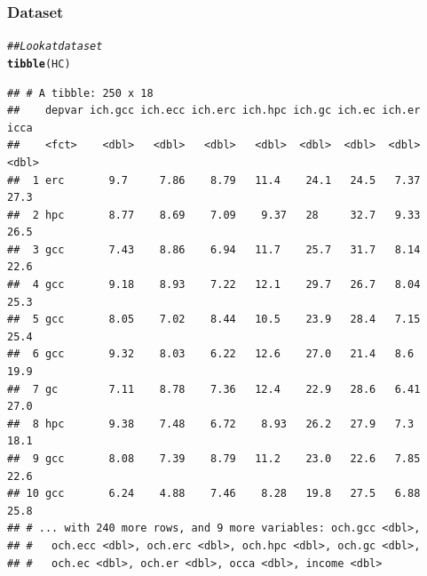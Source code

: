 \documentclass{beamer}\usepackage[]{graphicx}\usepackage[]{xcolor}
\makeatletter
\newcommand{\hlnum}[1]{\textcolor[rgb]{0.686,0.059,0.569}{#1}}%
\newcommand{\hlstr}[1]{\textcolor[rgb]{0.192,0.494,0.8}{#1}}%
\newcommand{\hlcom}[1]{\textcolor[rgb]{0.678,0.584,0.686}{\textit{#1}}}%
\newcommand{\hlopt}[1]{\textcolor[rgb]{0,0,0}{#1}}%
\newcommand{\hlstd}[1]{\textcolor[rgb]{0.345,0.345,0.345}{#1}}%
\newcommand{\hlkwb}[1]{\textcolor[rgb]{0.69,0.353,0.396}{#1}}%
\newcommand{\hlkwc}[1]{\textcolor[rgb]{0.333,0.667,0.333}{#1}}%
\newcommand{\hlkwd}[1]{\textcolor[rgb]{0.737,0.353,0.396}{\textbf{#1}}}%
\newenvironment{kframe}{%
 \def\at@end@of@kframe{}%
 \ifinner\ifhmode%
  \def\at@end@of@kframe{\end{minipage}}%
  \begin{minipage}{\columnwidth}%
 \fi\fi%
 \def\FrameCommand##1{\hskip\@totalleftmargin \hskip-\fboxsep
 \colorbox{shadecolor}{##1}\hskip-\fboxsep
     \hskip-\linewidth \hskip-\@totalleftmargin \hskip\columnwidth}%
 \MakeFramed {\advance\hsize-\width
   \@totalleftmargin\z@ \linewidth\hsize
   \@setminipage}}%
 {\par\unskip\endMakeFramed%
 \at@end@of@kframe}
\newenvironment{knitrout}{}{} %
\makeatother
\begin{document}
\begin{frame}[fragile]\frametitle{Dataset}
\begin{knitrout}\footnotesize
{}\color{fgcolor}\begin{kframe}
\begin{alltt}
\hlcom{## Look at dataset}
\hlkwd{tibble}\hlstd{(HC)}
\end{alltt}
\begin{verbatim}
## # A tibble: 250 x 18
##    depvar ich.gcc ich.ecc ich.erc ich.hpc ich.gc ich.ec ich.er  icca
##    <fct>    <dbl>   <dbl>   <dbl>   <dbl>  <dbl>  <dbl>  <dbl> <dbl>
##  1 erc       9.7     7.86    8.79   11.4    24.1   24.5   7.37  27.3
##  2 hpc       8.77    8.69    7.09    9.37   28     32.7   9.33  26.5
##  3 gcc       7.43    8.86    6.94   11.7    25.7   31.7   8.14  22.6
##  4 gcc       9.18    8.93    7.22   12.1    29.7   26.7   8.04  25.3
##  5 gcc       8.05    7.02    8.44   10.5    23.9   28.4   7.15  25.4
##  6 gcc       9.32    8.03    6.22   12.6    27.0   21.4   8.6   19.9
##  7 gc        7.11    8.78    7.36   12.4    22.9   28.6   6.41  27.0
##  8 hpc       9.38    7.48    6.72    8.93   26.2   27.9   7.3   18.1
##  9 gcc       8.08    7.39    8.79   11.2    23.0   22.6   7.85  22.6
## 10 gcc       6.24    4.88    7.46    8.28   19.8   27.5   6.88  25.8
## # ... with 240 more rows, and 9 more variables: och.gcc <dbl>,
## #   och.ecc <dbl>, och.erc <dbl>, och.hpc <dbl>, och.gc <dbl>,
## #   och.ec <dbl>, och.er <dbl>, occa <dbl>, income <dbl>
\end{verbatim}
\end{kframe}
\end{knitrout}
\end{frame}

\end{document}
